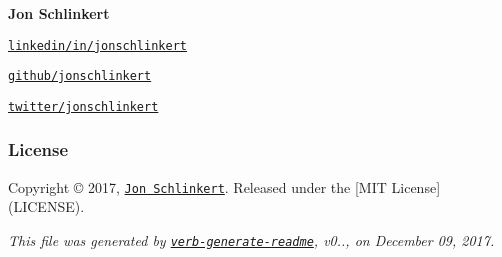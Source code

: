 {\bfseries Jon Schlinkert}


\begin{DoxyItemize}
\item \href{https://linkedin.com/in/jonschlinkert}{\tt linkedin/in/jonschlinkert}
\item \href{https://github.com/jonschlinkert}{\tt github/jonschlinkert}
\item \href{https://twitter.com/jonschlinkert}{\tt twitter/jonschlinkert}
\end{DoxyItemize}

\subsubsection*{License}

Copyright © 2017, \href{https://github.com/jonschlinkert}{\tt Jon Schlinkert}. Released under the \mbox{[}M\+IT License\mbox{]}(L\+I\+C\+E\+N\+SE).





{\itshape This file was generated by \href{https://github.com/verbose/verb-generate-readme}{\tt verb-\/generate-\/readme}, v0.., on December 09, 2017.} 